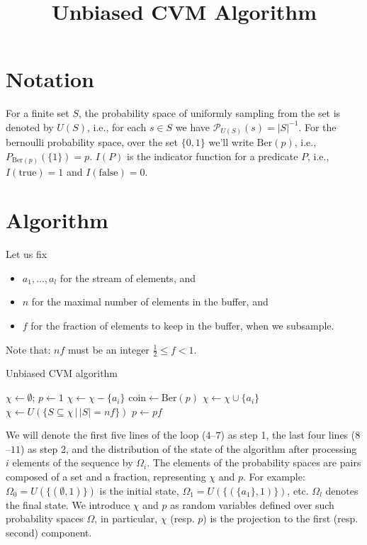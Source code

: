 \documentclass{article}
\newcommand{\prob}{\mathcal P}
\theoremstyle{definition}
\begin{document}
\title{Unbiased CVM Algorithm}
\maketitle
\section{Notation}
For a finite set $S$, the probability space of uniformly sampling from the set is denoted by $U(S)$, i.e., for each $s \in S$ we have
$\prob_{U(S)}({s}) = |S|^{-1}$.
For the bernoulli probability space, over the set $\{0,1\}$ we'll write $\mathrm{Ber}(p)$, i.e., $P_{\mathrm{Ber}(p)}(\{1\}) = p$.
$I(P)$ is the indicator function for a predicate $P$, i.e., $I(\mathrm{true}) = 1$ and $I(\mathrm{false}) = 0$.
\section{Algorithm}
Let us fix
\begin{itemize}
  \item $a_1,\ldots,a_l$ for the stream of elements, and
  \item $n$ for the maximal number of elements in the buffer, and
  \item $f$ for the fraction of elements to keep in the buffer, when we subsample.
\end{itemize}
Note that: $nf$ must be an integer $\frac{1}{2} \leq f < 1$.

\begin{algorithm}
\caption{Unbiased CVM algorithm}
\begin{algorithmic}[1]
\State $\chi \gets \emptyset$; $p \gets 1$
  \State $\chi \gets \chi - \{a_i\}$
  \State $\mathrm{coin} \gets \mathrm{Ber}(p)$
    \State $\chi \gets \chi \cup \{a_i\}$
  \EndIf
    \State $\chi \gets U(\{ S \subseteq \chi \,|\, |S|=nf \})$
    \State $p \gets p f$
  \EndIf
\EndFor
\State {}
\end{algorithmic}
\end{algorithm}

We will denote the first five lines of the loop ($4$--$7$) as step 1, the last four lines ($8$--$11$) as step 2, and the distribution of the state of the algorithm after processing $i$ elements of the sequence by $\Omega_i$.
The elements of the probability spaces are pairs composed of a set and a fraction, representing $\chi$ and $p$.
For example: $\Omega_0 = U(\{(\emptyset, 1)\})$ is the initial state, $\Omega_1 = U(\{(\{a_1\}, 1)\})$, etc. $\Omega_l$ denotes the final state.
We introduce $\chi$ and $p$ as random variables defined over such probability spaces $\Omega$, in particular, $\chi$ (resp. $p$) is the projection to the first (resp. second) component.
\end{document}
